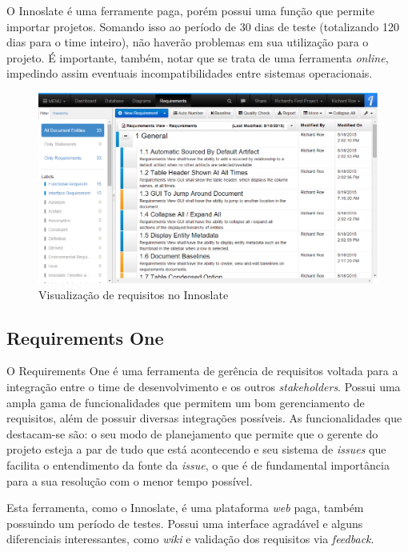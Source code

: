 O Innoslate é uma ferramente paga, porém possui uma função que permite importar projetos. Somando isso ao período de 30 dias de teste (totalizando 120 dias para o time inteiro), não haverão problemas em sua utilização para o projeto. É importante, também, notar que se trata de uma ferramenta \textit{online}, impedindo assim eventuais incompatibilidades entre sistemas operacionais.

\begin{figure}[htb]
\centering
  \includegraphics[keepaspectratio=true,scale=0.4]
  {figuras/innoslate.eps}
  \caption{Visualização de requisitos no Innoslate}
  \label{innoslate-pic}
\end{figure}

\clearpage{}

\subsection{Requirements One}

O Requirements One é uma ferramenta de gerência de requisitos voltada para a integração entre o time de desenvolvimento e os outros \textit{stakeholders}. Possui uma ampla gama de funcionalidades que permitem um bom gerenciamento de requisitos, além de possuir diversas integrações possíveis. As funcionalidades que destacam-se são: o seu modo de planejamento que permite que o gerente do projeto esteja a par de tudo que está acontecendo e seu sistema de \textit{issues} que facilita o entendimento da fonte da \textit{issue}, o que é de fundamental importância para a sua resolução com o menor tempo possível.

Esta ferramenta, como o Innoslate, é uma plataforma \textit{web} paga, também possuindo um período de testes. Possui uma interface agradável e alguns diferenciais interessantes, como \textit{wiki} e validação dos requisitos via \textit{feedback}. 

